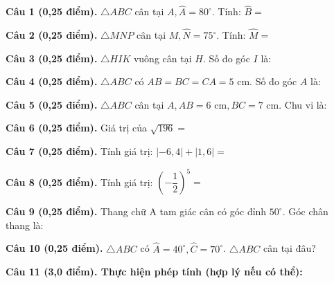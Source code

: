\documentclass[12pt,a4paper]{article}
\begin{document}
\vspace{1.2mm}
\noindent\textbf{Câu 1 (0,25 điểm).} $\triangle ABC$ cân tại $A, \widehat{A} = 80^\circ$. Tính: $\widehat{B} =$ \par\vspace{2.5mm}
\noindent\textbf{Câu 2 (0,25 điểm).} $\triangle MNP$ cân tại $M, \widehat{N} = 75^\circ$. Tính: $\widehat{M} =$ \par\vspace{2.5mm}
\noindent\textbf{Câu 3 (0,25 điểm).} $\triangle HIK$ vuông cân tại $H$. Số đo góc $I$ là: \par\vspace{2.5mm}
\noindent\textbf{Câu 4 (0,25 điểm).} $\triangle ABC$ có $AB = BC = CA = 5\text{ cm}$. Số đo góc $A$ là: \par\vspace{2.5mm}
\noindent\textbf{Câu 5 (0,25 điểm).} $\triangle ABC$ cân tại $A, AB = 6\text{ cm}, BC = 7\text{ cm}$. Chu vi là: \par\vspace{2.5mm}
\noindent\textbf{Câu 6 (0,25 điểm).} Giá trị của $\sqrt{196} =$ \par\vspace{2.5mm}
\noindent\textbf{Câu 7 (0,25 điểm).} Tính giá trị: $|-6{,}4| + |1{,}6| =$ \par\vspace{2.5mm}
\noindent\textbf{Câu 8 (0,25 điểm).} Tính giá trị: $\left(-\dfrac{1}{2}\right)^5 =$ \par\vspace{2.5mm}
\noindent\textbf{Câu 9 (0,25 điểm).} Thang chữ A tam giác cân có góc đỉnh $50^\circ$. Góc chân thang là: \par\vspace{2.5mm}
\noindent\textbf{Câu 10 (0,25 điểm).} $\triangle ABC$ có $\widehat{A} = 40^\circ, \widehat{C} = 70^\circ$. $\triangle ABC$ cân tại đâu? \par\vspace{2.5mm}
\vspace{0.2mm}
\noindent\textbf{Câu 11 (3,0 điểm). Thực hiện phép tính (hợp lý nếu có thể):}
\vspace{0.5mm}
\end{document}
